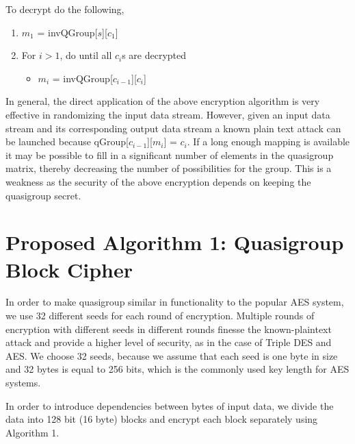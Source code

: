\documentclass[conference]{IEEEtran}
\begin{document}
To decrypt do the following,
\begin{enumerate}
  \item $m_1$ = invQGroup[$s$][$c_1$]
  \item For $i>1$, do until all $c_i$s are decrypted
  \begin{itemize}
    \item $m_i$ = invQGroup[$c_{i-1}$][$c_i$]
  \end{itemize}
\end{enumerate}

In general, the direct application of the above encryption algorithm is very effective in randomizing the input data stream. However, given an input data stream and its corresponding output data stream a known plain text attack can be launched because qGroup[$c_{i-1}$][$m_i$] = $c_{i}$. If a long enough mapping is available it may be possible to fill in a significant number of elements in the quasigroup matrix, thereby decreasing the number of possibilities for the group. This is a weakness as the security of the above encryption depends on keeping the quasigroup secret.

\section{Proposed Algorithm 1: Quasigroup Block Cipher}
In order to make quasigroup similar in functionality to the popular AES system, we use 32 different seeds for each round of encryption. Multiple rounds of encryption with different seeds in different rounds finesse the known-plaintext attack and provide a higher level of security, as in the case of Triple DES and AES. We choose 32 seeds, because we assume that each seed is one byte in size and 32 bytes is equal to 256 bits, which is the commonly used key length for AES systems.

In order to introduce dependencies between bytes of input data, we divide the data into 128 bit (16 byte) blocks and encrypt each block separately using Algorithm 1.\\
\end{document}
